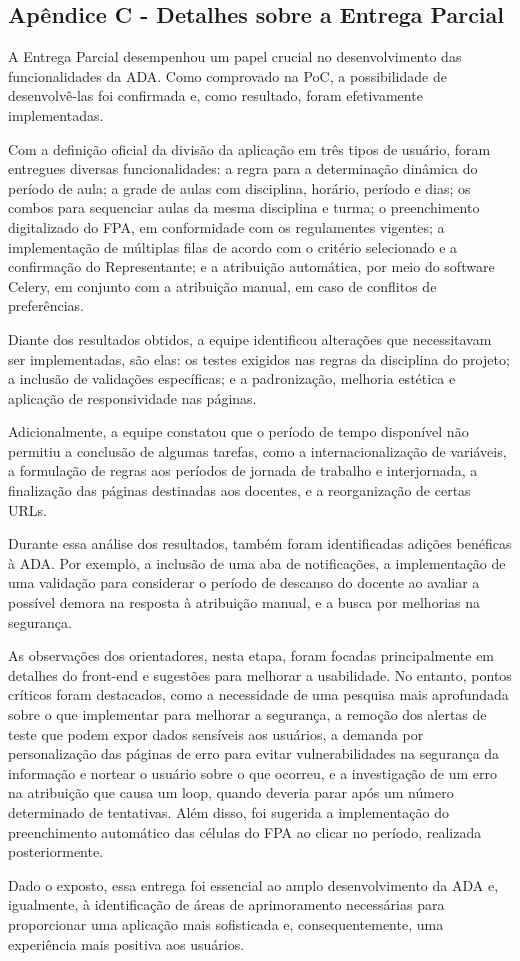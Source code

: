 \documentclass[12pt]{article}
\begin{document}
\subsection{Apêndice C - Detalhes sobre a Entrega Parcial}
\par A Entrega Parcial desempenhou um papel crucial no desenvolvimento das funcionalidades da ADA. Como comprovado na PoC, a possibilidade de desenvolvê-las foi confirmada e, como resultado, foram efetivamente implementadas.
\par Com a definição oficial da divisão da aplicação em três tipos de usuário, foram entregues diversas funcionalidades: a regra para a determinação dinâmica do período de aula; a grade de aulas com disciplina, horário, período e dias; os combos para sequenciar aulas da mesma disciplina e turma; o preenchimento digitalizado do FPA, em conformidade com os regulamentes vigentes;  a implementação de múltiplas filas de acordo com o critério selecionado e a confirmação do Representante; e a atribuição automática, por meio do software Celery, em conjunto com a atribuição manual, em caso de conflitos de preferências.
\par Diante dos resultados obtidos, a equipe identificou alterações que necessitavam ser implementadas, são elas: os testes exigidos nas regras da disciplina do projeto; a inclusão de validações específicas; e a padronização, melhoria estética e aplicação de responsividade nas páginas.
\par Adicionalmente, a equipe constatou que o período de tempo disponível não permitiu a conclusão de algumas tarefas, como a internacionalização de variáveis, a formulação de regras aos períodos de jornada de trabalho e interjornada, a finalização das páginas destinadas aos docentes, e a reorganização de certas URLs.
\par Durante essa análise dos resultados, também foram identificadas adições benéficas à ADA. Por exemplo, a inclusão de uma aba de notificações, a implementação de uma validação para considerar o período de descanso do docente ao avaliar a possível demora na resposta à atribuição manual, e a busca por melhorias na segurança.
\par As observações dos orientadores, nesta etapa, foram focadas principalmente em detalhes do front-end e sugestões para melhorar a usabilidade. No entanto, pontos críticos foram destacados, como a necessidade de uma pesquisa mais aprofundada sobre o que implementar para melhorar a segurança, a remoção dos alertas de teste que podem expor dados sensíveis aos usuários, a demanda por personalização das páginas de erro para evitar vulnerabilidades na segurança da informação e nortear o usuário sobre o que ocorreu, e a investigação de um erro na atribuição que causa um loop, quando deveria parar após um número determinado de tentativas. Além disso, foi sugerida a implementação do preenchimento automático das células do FPA ao clicar no período, realizada posteriormente.
\par Dado o exposto, essa entrega foi essencial ao amplo desenvolvimento da ADA e, igualmente, à identificação de áreas de aprimoramento necessárias para proporcionar uma aplicação mais sofisticada e, consequentemente, uma experiência mais positiva aos usuários.
\end{document}
